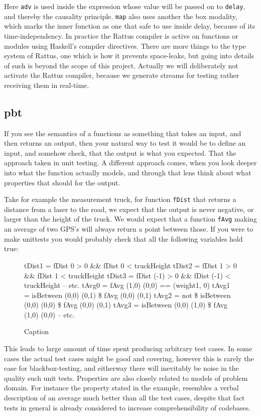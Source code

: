 Here \verb|adv| is used inside the expression whose value will be passed on to \verb|delay|, and thereby the causality principle. \verb|map| also uses another the box modality, which marks the inner function as one that safe to use inside delay, because of its time-independency. 
In practice the Rattus compiler is active on functions or modules using Haskell's compiler directives.
There are more things to the type system of Rattus, one which is how it prevents space-leaks, but going into details of such is beyond the scope of this project. Actually we will deliberately not activate the Rattus compiler, because we generate streams for testing rather receiving them in real-time. 




\subsection{\acrlong{pbt}}
\par If you see the semantics of a functions as something that takes an input, and then returns an output, then your natural way to test it would be to define an input, and somehow check, that the output is what you expected. That the approach taken in unit testing.
A different approach comes, when you look deeper into what the function actually models, and through that lens think about what properties that should for the output.

Take for example the measurement truck, for function \verb|fDist| that returns a distance from a laser to the road, we expect that the output is never negative, or larger than the height of the truck. We would expect that a function \verb|fAvg| making an average of two GPS's will always return a point between those.
If you were to make unittests you would probably check that all the following variables hold true:
\begin{figure}
    \begin{hscode}
        tDist1 = fDist 0 > 0 && fDist 0 < truckHeight
        tDist2 = fDist 1 > 0 && fDist 1 < truckHeight
        tDist3 = fDist (-1) > 0 && fDist (-1) < truckHeight
        -- etc. 
        tAvg0 = fAvg (1,0) (0,0) == (weight1, 0)
        tAvg1 = isBetween (0,0) (0,1) \$ fAvg (0,0) (0,1) 
        tAvg2 = not \$ isBetween (0,0) (0,0) \$ fAvg (0,0) (0,1) 
        tAvg3 = isBetween (0,0) (1,0) \$ fAvg (1,0) (0,0)
        -- etc.    
    \end{hscode}
        \caption{Caption}
    \label{lst:unitTests}
\end{figure}
This leads to large amount of time spent producing arbitrary test cases. In some cases the actual test cases might be good and covering, however this is rarely the case for blackbox-testing, and eitherway there will inevitably be noise in the quality such unit tests.
Properties are also closely related to models of problem domain. For instance the property stated in the example, resembles a verbal description of an average much better than all the test cases, despite that fact tests in general is already considered to increase comprehensibility of codebases.


